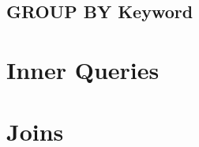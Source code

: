 \documentclass{beamer}
\begin{document}
	\subsection{GROUP BY Keyword}
	\begin{frame}
		
	\end{frame}
	
	\section{Inner Queries}
	\begin{frame}
		
	\end{frame}
	
	\section{Joins}
	\begin{frame}{}
	
	\end{frame}
\end{document}
